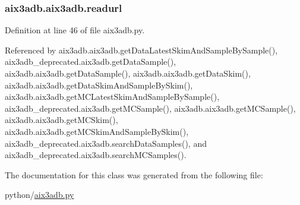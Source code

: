 \subsubsection[{readurl}]{\setlength{\rightskip}{0pt plus 5cm}aix3adb.\-aix3adb.\-readurl}\label{classaix3adb_1_1aix3adb_aa6b9e6321ecd56b4269f7adf44cfa101}


Definition at line 46 of file aix3adb.\-py.



Referenced by aix3adb.\-aix3adb.\-get\-Data\-Latest\-Skim\-And\-Sample\-By\-Sample(), aix3adb\-\_\-deprecated.\-aix3adb.\-get\-Data\-Sample(), aix3adb.\-aix3adb.\-get\-Data\-Sample(), aix3adb.\-aix3adb.\-get\-Data\-Skim(), aix3adb.\-aix3adb.\-get\-Data\-Skim\-And\-Sample\-By\-Skim(), aix3adb.\-aix3adb.\-get\-M\-C\-Latest\-Skim\-And\-Sample\-By\-Sample(), aix3adb\-\_\-deprecated.\-aix3adb.\-get\-M\-C\-Sample(), aix3adb.\-aix3adb.\-get\-M\-C\-Sample(), aix3adb.\-aix3adb.\-get\-M\-C\-Skim(), aix3adb.\-aix3adb.\-get\-M\-C\-Skim\-And\-Sample\-By\-Skim(), aix3adb\-\_\-deprecated.\-aix3adb.\-search\-Data\-Samples(), and aix3adb\-\_\-deprecated.\-aix3adb.\-search\-M\-C\-Samples().



The documentation for this class was generated from the following file\-:\begin{DoxyCompactItemize}
\item 
python/\hyperlink{aix3adb_8py}{aix3adb.\-py}\end{DoxyCompactItemize}

